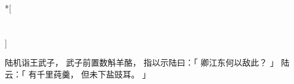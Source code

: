 
\switchcolumn[0]*[\section{}]

陆机诣王武子，
武子前置数斛羊酪，
指以示陆曰：「
    卿江东何以敌此？
」
陆云：「
    有千里莼羹，
    但未下盐豉耳。
」

\switchcolumn



